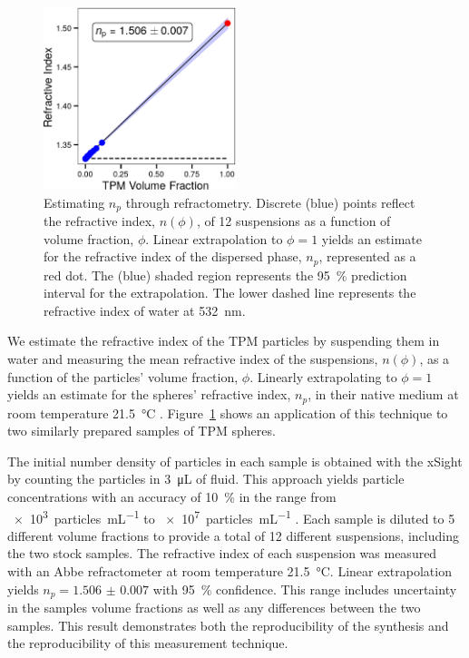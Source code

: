 \documentclass[journal=langd5,manuscript=article]{achemso}
\begin{document}
\begin{figure}
  \centering
  \includegraphics[width=0.5\textwidth]{abbe02}
  \caption{Estimating $n_p$ through refractometry.
    Discrete (blue) points reflect the refractive index,
    $n(\phi)$, of \num{12} suspensions as a function of volume fraction,
    $\phi$. Linear extrapolation to $\phi = 1$
    yields an estimate for the refractive index of the dispersed phase,
    $n_p$, represented as a red dot.
    The (blue) shaded region represents the \SI{95}{\percent}
    prediction interval for the extrapolation.
    The lower dashed line represents the refractive index of water at
    \SI{532}{\nm}.}
  \label{fig:abbe}
\end{figure}

We estimate the refractive index of the TPM particles
by suspending them in water and measuring the mean refractive index of
the suspensions,
$n(\phi)$,
as a function of the particles' volume fraction, $\phi$.
Linearly extrapolating  to $\phi = 1$
yields an estimate for the spheres' refractive index,
$n_p$,
in their native medium at room temperature \SI{21.5}{\celsius}
\cite{alexander81}.
Figure~\ref{fig:abbe} shows an application
of this technique to two similarly prepared
samples of TPM spheres.

The initial number density of particles in each
sample is obtained with the xSight by counting
the particles in \SI{3}{\micro\liter} of fluid.
This approach yields particle concentrations with
an accuracy of \SI{10}{\percent} in the range
from \SI{e3}{particles\per\milli\liter}
to \SI{e7}{particles\per\milli\liter} \cite{wang2016holographic}.
Each sample is diluted to \num{5} different volume 
fractions to provide a total of \num{12}
different suspensions, including the two stock samples.
The refractive index of each
suspension was measured with an Abbe refractometer
at room temperature \SI{21.5}{\degreeCelsius}.
Linear extrapolation yields
$n_p = \num{1.506(7)}$ with \SI{95}{\percent} confidence.
This range includes uncertainty in the samples
volume fractions as well as any differences between the
two samples.
This result demonstrates both the reproducibility of the
synthesis and the reproducibility of this measurement
technique.
\end{document}
